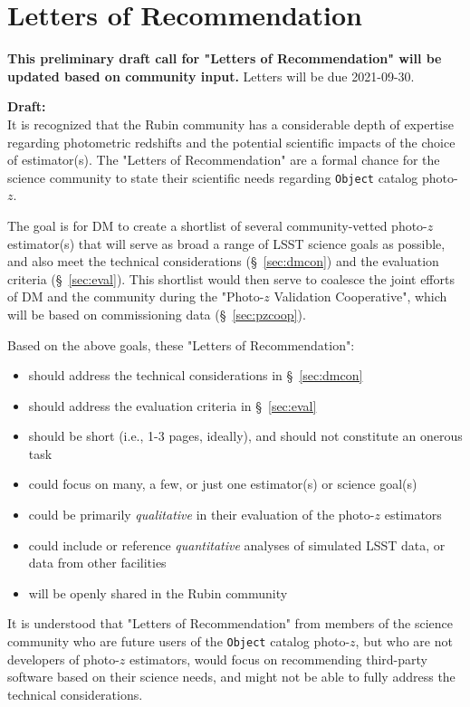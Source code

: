 \documentclass[DM,authoryear,toc]{lsstdoc}
\begin{document}
\section{Letters of Recommendation} \label{sec:lor}

\textbf{This preliminary draft call for "Letters of Recommendation" will be updated based on community input.} Letters will be due 2021-09-30.

\textbf{Draft:} \\
It is recognized that the Rubin community has a considerable depth of expertise regarding photometric redshifts and the potential scientific impacts of the choice of estimator(s).
The "Letters of Recommendation" are a formal chance for the science community to state their scientific needs regarding {\tt Object} catalog photo-$z$.

The goal is for DM to create a shortlist of several community-vetted photo-$z$ estimator(s) that will serve as broad a range of LSST science goals as possible, and also meet the technical considerations (\S~\ref{sec:dmcon}) and the evaluation criteria (\S~\ref{sec:eval}).
This shortlist would then serve to coalesce the joint efforts of DM and the community during the  "Photo-$z$ Validation Cooperative", which will be based on commissioning data (\S~\ref{sec:pzcoop}). 

Based on the above goals, these "Letters of Recommendation":
\begin{itemize}
\item should address the technical considerations in \S~\ref{sec:dmcon}
\item should address the evaluation criteria in  \S~\ref{sec:eval}
\item should be short (i.e., 1-3 pages, ideally), and should not constitute an onerous task
\item could focus on many, a few, or just one estimator(s) or science goal(s)
\item could be primarily {\it qualitative} in their evaluation of the photo-$z$ estimators
\item could include or reference {\it quantitative} analyses of simulated LSST data, or data from other facilities
\item will be openly shared in the Rubin community
\end{itemize}

It is understood that "Letters of Recommendation" from members of the science community who are future users of the {\tt Object} catalog photo-$z$, but who are not developers of photo-$z$ estimators, would focus on recommending third-party software based on their science needs, and might not be able to fully address the technical considerations.
\end{document}
